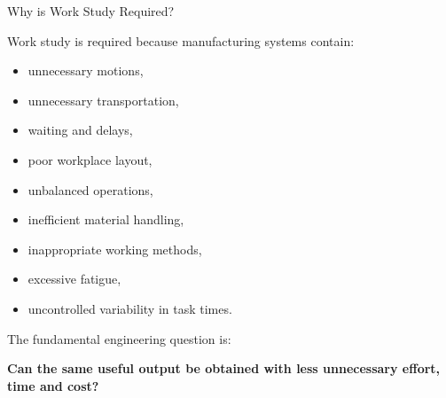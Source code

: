 \documentclass[aspectratio=169,10pt]{beamer}
\begin{document}
\begin{frame}[shrink=18]{Why is Work Study Required?}
\small

Work study is required because manufacturing systems contain:

\begin{itemize}
    \item unnecessary motions,
    \item unnecessary transportation,
    \item waiting and delays,
    \item poor workplace layout,
    \item unbalanced operations,
    \item inefficient material handling,
    \item inappropriate working methods,
    \item excessive fatigue,
    \item uncontrolled variability in task times.
\end{itemize}

\vspace{4pt}

The fundamental engineering question is:

\begin{center}
\Large
\textbf{Can the same useful output be obtained with less unnecessary effort, time and cost?}
\end{center}

\end{frame}

\end{document}
